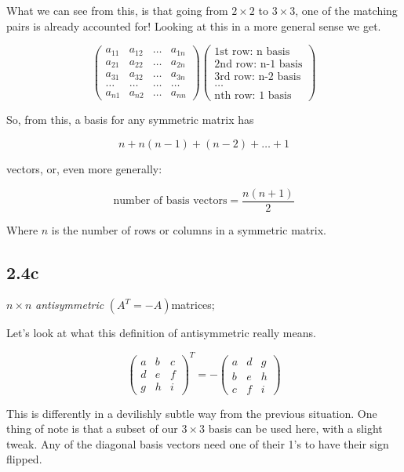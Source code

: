 What we can see from this, is that going from $2 \times 2$ to $3 \times 3$, one of the matching pairs is already accounted for! Looking at this in a more general sense we get.

\[
	\begin{pmatrix}
		a_{11} & a_{12} & \dots & a_{1n} \\
		a_{21} & a_{22} & \dots & a_{2n} \\
		a_{31} & a_{32} & \dots & a_{3n} \\
		\dots & \dots & \dots & \dots \\
		a_{n1} & a_{n2} & \dots & a_{nn}
	\end{pmatrix} 
	\begin{pmatrix}
		\text{1st row: n basis} \\
		\text{2nd row: n-1 basis} \\
		\text{3rd row: n-2 basis} \\
		\dots \\
		\text{nth row: 1 basis}
	\end{pmatrix}
\]

So, from this, a basis for any symmetric matrix has 

\[n + n(n-1) + (n - 2) + \dots + 1\]

vectors, or, even more generally:

\[\text{number of basis vectors} = \frac{n(n+1)}{2}\]

Where $n$ is the number of rows or columns in a symmetric matrix.

\subsection*{2.4c} $n \times n$ \emph{antisymmetric} $\left( A^T = -A \right) $matrices;

Let's look at what this definition of antisymmetric really means. 

\[
	\begin{pmatrix}
		a & b & c \\
		d & e & f \\
		g & h & i
	\end{pmatrix}^T = 
	-\begin{pmatrix}
		a & d & g \\
		b & e & h \\
		c & f & i
	\end{pmatrix}
\]

This is differently in a devilishly subtle way from the previous situation. One thing of note is that a subset of our $3 \times 3$ basis can be used here, with a slight tweak. Any of the diagonal basis vectors need one of their 1's to have their sign flipped. 

